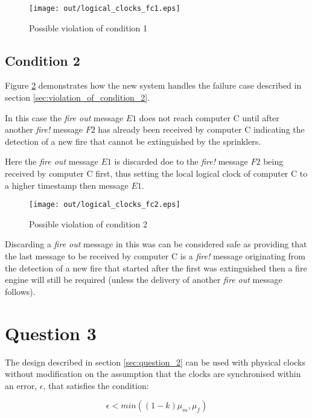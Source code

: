 \documentclass[twocolumn]{article}
\begin{document}
\begin{figure}[h!]
  \centering
  \texttt{[image: out/logical\_clocks\_fc1.eps]}
  \caption{Possible violation of condition 1}
  \label{fig:logical_clocks_fc1}
\end{figure}

\subsection{Condition 2}

Figure \ref{fig:logical_clocks_fc2} demonstrates how the new system handles the
failure case described in section \ref{sec:violation_of_condition_2}.

In this case the \textit{fire out} message $E1$ does not reach computer C until
after another \textit{fire!} message $F2$ has already been received by computer
C indicating the detection of a new fire that cannot be extinguished by the
sprinklers.

Here the \textit{fire out} message $E1$ is discarded doe to the \textit{fire!}
message $F2$ being received by computer C first, thus setting the local logical
clock of computer C to a higher timestamp then message $E1$.

\begin{figure}[h!]
  \centering
  \texttt{[image: out/logical\_clocks\_fc2.eps]}
  \caption{Possible violation of condition 2}
  \label{fig:logical_clocks_fc2}
\end{figure}

Discarding a \textit{fire out} message in this was can be considered safe as
providing that the last message to be received by computer C is a \textit{fire!}
message originating from the detection of a new fire that started after the
first was extinguished then a fire engine will still be required (unless the
delivery of another \textit{fire out} message follows).

\section{Question 3}

The design described in section \ref{sec:question_2} can be used with physical
clocks without modification on the assumption that the clocks are synchronised
within an error, $\epsilon$, that satisfies the condition:

\begin{equation}
  \epsilon < min((1-k) \mu_{m}, \mu_{f})
  \label{eq:epsilon}
\end{equation}
\end{document}
